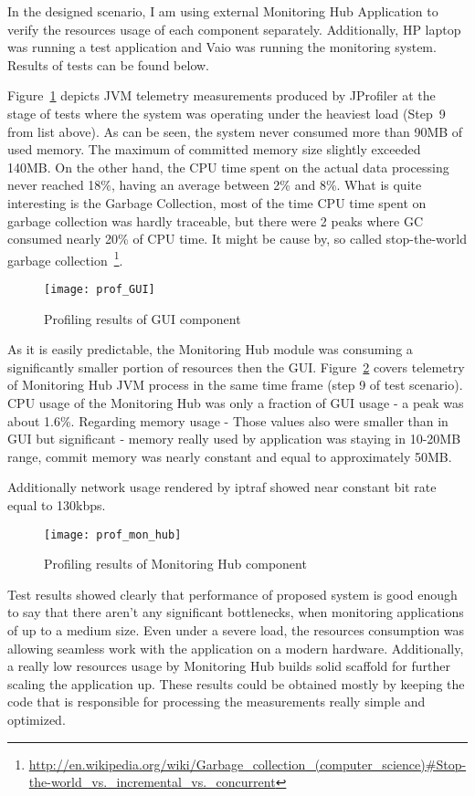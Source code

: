 In the designed scenario, I am using external Monitoring Hub Application to verify the resources usage of each component separately. Additionally, HP laptop was running a test application and Vaio was running the monitoring system. Results of tests can be found below.

Figure~\ref{fig:prof_GUI} depicts JVM telemetry measurements produced by JProfiler at the stage of tests where the system was operating under the heaviest load (Step~9 from list above). As can be seen, the system never consumed more than 90MB of used memory. The maximum of committed memory size slightly exceeded 140MB. On the other hand, the CPU time spent on the actual data processing never reached 18\%, having an average between 2\% and 8\%. What is quite interesting is the Garbage Collection, most of the time CPU time spent on garbage collection was hardly traceable, but there were 2 peaks where GC consumed nearly 20\% of CPU time. It might be cause by, so called stop-the-world garbage collection~\footnote{\url{http://en.wikipedia.org/wiki/Garbage_collection_(computer_science)#Stop-the-world_vs._incremental_vs._concurrent}}.

\begin{figure}[ht]
\centering
\texttt{[image: prof\_GUI]}
\caption{Profiling results of GUI component}
\label{fig:prof_GUI}
\end{figure}


As it is easily predictable, the Monitoring Hub module was consuming a significantly smaller portion of resources then the GUI. Figure~\ref{fig:prof_mon_hub} covers telemetry of Monitoring Hub JVM process in the same time frame (step 9 of test scenario). CPU usage of the Monitoring Hub was only a fraction of GUI usage - a peak was about 1.6\%. Regarding memory usage - Those values also were smaller than in GUI but significant - memory really used by application was staying in 10-20MB range, commit memory was nearly constant and equal to approximately 50MB.

Additionally network usage rendered by iptraf showed near constant bit rate equal to 130kbps.

\begin{figure}[ht]
\centering
\texttt{[image: prof\_mon\_hub]}
\caption{Profiling results of Monitoring Hub component}
\label{fig:prof_mon_hub}
\end{figure}

Test results showed clearly that performance of proposed system is good enough to say that there aren\rq{}t any significant bottlenecks, when monitoring applications of up to a medium size. Even under a severe load, the resources consumption was allowing seamless work with the application on a modern hardware. Additionally, a really low resources usage by Monitoring Hub builds solid scaffold for further scaling the application up. These results could be obtained mostly by keeping the code that is responsible for processing the measurements really simple and optimized.

